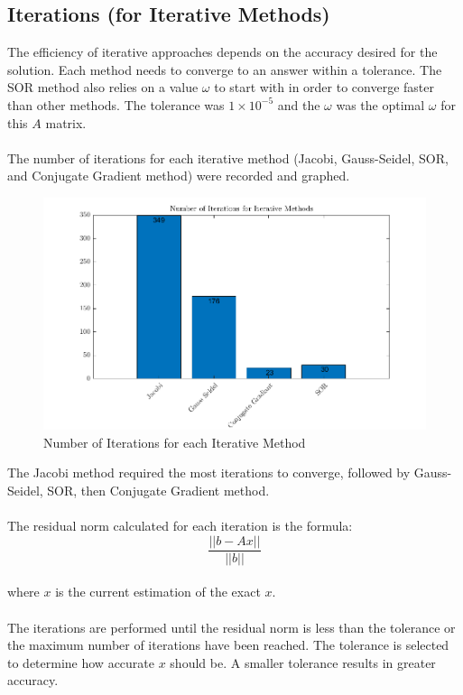 \documentclass[12pt,a4paper]{article}
\begin{document}
\subsection{Iterations (for Iterative Methods)}
The efficiency of iterative approaches depends on the accuracy desired for the solution. Each method needs to converge to an answer within a tolerance. The SOR method also relies on a value $\omega$ to start with in order to converge faster than other methods. The tolerance was $1\times10^{-5}$ and the $\omega$ was the optimal $\omega$ for this $A$ matrix.
\\\\
The number of iterations for each iterative method (Jacobi, Gauss-Seidel, SOR, and Conjugate Gradient method) were recorded and graphed.
\begin{figure}[H]
	\includegraphics[width=\linewidth]{images/IterationsGraph.png}
	\caption{Number of Iterations for each Iterative Method}
	\label{fig:iterations}
\end{figure}
The Jacobi method required the most iterations to converge, followed by Gauss-Seidel, SOR, then Conjugate Gradient method.
\\\\
The residual norm calculated for each iteration is the formula: 
\\
$$\frac{||b-Ax||}{||b||}$$
\\
where $x$ is the current estimation of the exact $x$.
\\\\
The iterations are performed until the residual norm is less than the tolerance or the maximum number of iterations have been reached. The tolerance is selected to determine how accurate $x$ should be. A smaller tolerance results in greater accuracy.
\end{document}
